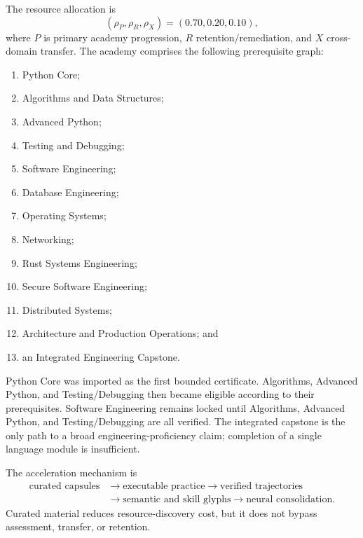 The resource allocation is
\begin{equation}
(\rho_{P},\rho_{R},\rho_{X})=(0.70,0.20,0.10),
\label{eq:academy-allocation}
\end{equation}
where $P$ is primary academy progression, $R$ retention/remediation, and $X$
cross-domain transfer.  The academy comprises the following prerequisite graph:
\begin{enumerate}[leftmargin=1.8em]
    \item Python Core;
    \item Algorithms and Data Structures;
    \item Advanced Python;
    \item Testing and Debugging;
    \item Software Engineering;
    \item Database Engineering;
    \item Operating Systems;
    \item Networking;
    \item Rust Systems Engineering;
    \item Secure Software Engineering;
    \item Distributed Systems;
    \item Architecture and Production Operations; and
    \item an Integrated Engineering Capstone.
\end{enumerate}
Python Core was imported as the first bounded certificate.  Algorithms,
Advanced Python, and Testing/Debugging then became eligible according to their
prerequisites.  Software Engineering remains locked until Algorithms, Advanced
Python, and Testing/Debugging are all verified.  The integrated capstone is the
only path to a broad engineering-proficiency claim; completion of a single
language module is insufficient.

The acceleration mechanism is
\begin{equation}
\begin{aligned}
\text{curated capsules}
&\rightarrow \text{executable practice}
\rightarrow \text{verified trajectories} \\
&\rightarrow \text{semantic and skill glyphs}
\rightarrow \text{neural consolidation}.
\end{aligned}
\label{eq:accelerated-learning-consolidation}
\end{equation}
Curated material reduces resource-discovery cost, but it does not bypass
assessment, transfer, or retention.

